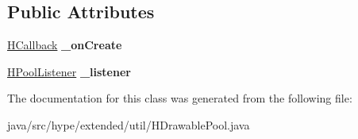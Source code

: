 \subsection*{Public Attributes}
\begin{DoxyCompactItemize}
\item 
\hypertarget{classhype_1_1extended_1_1util_1_1_h_drawable_pool_a4d0b031a7881751795b893483b0f2c6f}{\hyperlink{interfacehype_1_1core_1_1interfaces_1_1_h_callback}{H\-Callback} {\bfseries \-\_\-on\-Create}}\label{classhype_1_1extended_1_1util_1_1_h_drawable_pool_a4d0b031a7881751795b893483b0f2c6f}

\item 
\hypertarget{classhype_1_1extended_1_1util_1_1_h_drawable_pool_a5c6fe30f3d7a63b0e32982b57f38e4e3}{\hyperlink{interfacehype_1_1extended_1_1interfaces_1_1_h_pool_listener}{H\-Pool\-Listener} {\bfseries \-\_\-listener}}\label{classhype_1_1extended_1_1util_1_1_h_drawable_pool_a5c6fe30f3d7a63b0e32982b57f38e4e3}

\end{DoxyCompactItemize}


The documentation for this class was generated from the following file\-:\begin{DoxyCompactItemize}
\item 
java/src/hype/extended/util/H\-Drawable\-Pool.\-java\end{DoxyCompactItemize}

